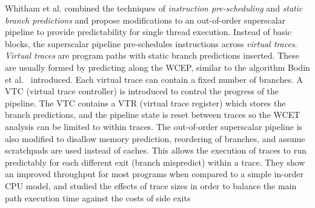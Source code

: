 

Whitham et al. \cite{whitham:08:predOOOwithVirtualTraces} combined the techniques of \emph{instruction pre-scheduling} and \emph{static branch predictions} and propose modifications to an out-of-order superscalar pipeline to provide predictability for single thread execution.  
Instead of basic blocks, the superscalar pipeline pre-schedules instructions across \emph{virtual traces}\cite{Whitham2008formvirtualtraces}. 
\emph{Virtual traces} are program paths with static branch predictions inserted. 
These are usually formed by predicting along the WCEP, similar to the algorithm Bodin et al.~\cite{Bodin2005staticbranch} introduced. 
Each virtual trace can contain a fixed number of branches. 
A VTC (virtual trace controller) is introduced to control the progress of the pipeline.
The VTC contains a VTR (virtual trace register) which stores the branch predictions, and the pipeline state is reset between traces so the WCET analysis can be limited to within traces.
The out-of-order superscalar pipeline is also modified to disallow memory prediction, reordering of branches, and assume scratchpads are used instead of caches.  
This allows the execution of traces to run predictably for each different exit (branch mispredict) within a trace.
They show an improved throughput for most programs when compared to a simple in-order CPU model, and studied the effects of trace sizes in order to balance the main path execution time against the costs of side exits 


